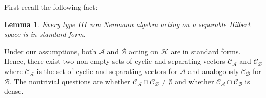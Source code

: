 \documentclass[a4paper,11pt]{article}
\newtheorem{lemma}[theorem]{Lemma}
\theoremstyle{definition}
\begin{document}
First recall the following fact\cite{blackadar}:
\begin{lemma}\label{lemma:blackadar}
    Every type $III$ von Neumann algebra acting on a separable Hilbert space is in standard form.
\end{lemma}
Under our assumptions, both $\mathcal{A}$ and $\mathcal{B}$ acting on $\mathcal{H}$ are in standard forms. Hence, there exist two non-empty sets of cyclic and separating vectors $\mathcal{C}_\mathcal{A}$ and $\mathcal{C}_\mathcal{B}$ where $\mathcal{C}_\mathcal{A}$ is the set of cyclic and separating vectors for $\mathcal{A}$ and analogously $\mathcal{C}_\mathcal{B}$ for $\mathcal{B}$. The nontrivial questions are whether $\mathcal{C}_\mathcal{A}\cap\mathcal{C}_\mathcal{B} \neq\emptyset$ and whether $\mathcal{C}_\mathcal{A}\cap\mathcal{C}_\mathcal{B}$ is dense. 
\end{document}
